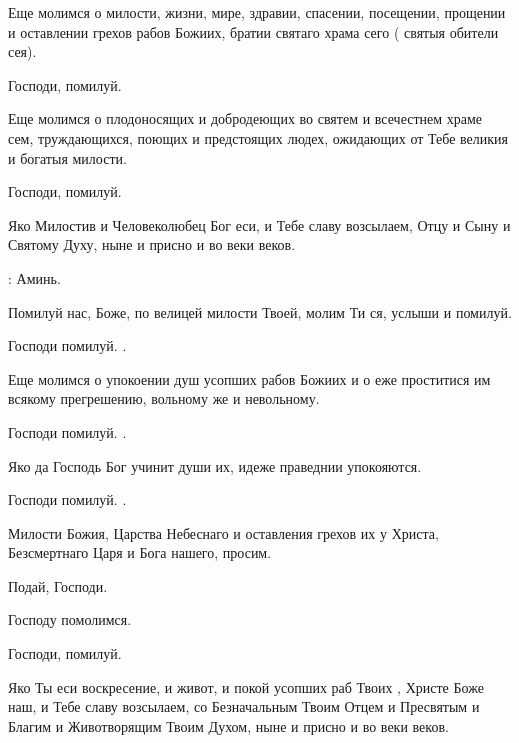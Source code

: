 \begin{mymulticols}
 Еще молимся о милости, жизни, мире, здравии, спасении, посещении, прощении и оставлении грехов рабов Божиих, братии святаго храма сего ( святыя обители сея). 

 Господи, помилуй.  

 Еще молимся о плодоносящих и добродеющих во святем и всечестнем храме сем, труждающихся, поющих и предстоящих людех, ожидающих от Тебе великия и богатыя милости.

 Господи, помилуй.  

 Яко Милостив и Человеколюбец Бог еси, и Тебе славу возсылаем, Отцу и Сыну и Святому Духу, ныне и присно и во веки веков.

: Аминь.



 Помилуй нас, Боже, по велицей милости Твоей, молим Ти ся, услыши и помилуй.

 Господи помилуй. . 

 Еще молимся о упокоении душ усопших рабов Божиих  и о еже проститися им всякому прегрешению, вольному же и невольному.

 Господи помилуй. . 

 Яко да Господь Бог учинит души их, идеже праведнии упокояются.

 Господи помилуй. . 

 Милости Божия, Царства Небеснаго и оставления грехов их у Христа, Безсмертнаго Царя и Бога нашего, просим.

 Подай, Господи.

 Господу помолимся.

 Господи, помилуй.

 Яко Ты еси воскресение, и живот, и покой усопших раб Твоих , Христе Боже наш, и Тебе славу возсылаем, со Безначальным Твоим Отцем и Пресвятым и Благим и Животворящим Твоим Духом, ныне и присно и во веки веков.


\end{mymulticols}
